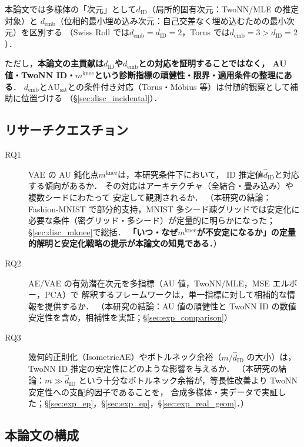 \documentclass[11pt,a4paper]{jsarticle}
\newcommand{\dID}{d_{\mathrm{ID}}}
\newcommand{\AUsat}{\mathrm{AU}_{\mathrm{sat}}}
\newcommand{\mknee}{m^{\mathrm{knee}}}
\newcommand{\demb}{d_{\mathrm{emb}}}
\begin{document}
本論文では多様体の「次元」として$\dID$（局所的固有次元：TwoNN/MLE の推定対象）と
$\demb$（位相的最小埋め込み次元：自己交差なく埋め込むための最小次元）を区別する
（Swiss Roll では$\demb = \dID = 2$，Torus では$\demb = 3 > \dID = 2$）．

ただし，\textbf{本論文の主貢献は$\dID$や$\demb$との対応を証明することではなく，
AU 値・TwoNN ID・$\mknee$という診断指標の頑健性・限界・適用条件の整理にある}．
$\demb$と$\AUsat$との条件付き対応（Torus・Möbius 等）は付随的観察として補助に位置づける
（§\ref{sec:disc_incidental}）．

\subsection{リサーチクエスチョン}\label{sec:intro_rq}

\begin{description}
  \item[RQ1] VAE の AU 鈍化点$\mknee$は，本研究条件下において，
             ID 推定値$\hat{d}_\mathrm{ID}$と対応する傾向があるか．
             その対応はアーキテクチャ（全結合・畳み込み）や複数シードにわたって
             安定して観測されるか．
             （本研究の結論：Fashion-MNIST で部分的支持，MNIST 多シード疎グリッドでは安定化に必要な条件（密グリッド・多シード）が定量的に明らかになった；
             §\ref{sec:disc_mknee}で総括．
             \textbf{「いつ・なぜ$\mknee$が不安定になるか」の定量的解明と安定化戦略の提示が本論文の知見である．}）
  \item[RQ2] AE/VAE の有効潜在次元を多指標（AU 値，TwoNN/MLE，MSE エルボー，PCA）で
             解釈するフレームワークは，単一指標に対して相補的な情報を提供するか．
             （本研究の結論：AU 値の頑健性と TwoNN ID の数値安定性を含め，相補性を実証；§\ref{sec:exp_comparison}）
  \item[RQ3] 幾何的正則化（IsometricAE）やボトルネック余裕（$m / \hat{d}_\mathrm{ID}$ の大小）は，
             TwoNN ID 推定の安定性にどのような影響を与えるか．
             （本研究の結論：$m \gg \hat{d}_\mathrm{ID}$ という十分なボトルネック余裕が，等長性改善より TwoNN 安定性への支配的因子であることを，
             合成多様体・実データで実証した；§\ref{sec:exp_ep}，§\ref{sec:exp_ep}，§\ref{sec:exp_real_geom}．）
\end{description}

\subsection{本論文の構成}\label{sec:intro_structure}
\end{document}
